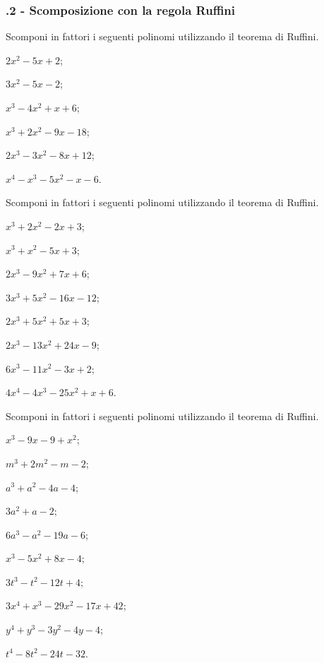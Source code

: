 \subsubsection*{\thechapter.2 - Scomposizione con la regola Ruffini}

\begin{esercizio}
\label{ese:17.11}
Scomponi in fattori i seguenti polinomi utilizzando il teorema di
Ruffini.
\begin{multicols}{3}
 \begin{enumeratea}
 \item $2x^{2}-5x+2$;
\item $3x^{2}-5x-2$;
\item $x^{3}-4x^{2}+x+6$;
\item $x^{3}+2x^{2}-9x-18$;
\item $2x^{3}-3x^{2}-8x+12$;
\item $x^{4}-x^{3}-5x^{2}-x-6$.
 \end{enumeratea}
\end{multicols}
\end{esercizio}

\begin{esercizio}
\label{ese:17.12}
Scomponi in fattori i seguenti polinomi utilizzando il teorema di
Ruffini.
\begin{multicols}{2}
 \begin{enumeratea}
 \item $x^{3}+2x^{2}-2x+3$;
\item $x^{3}+x^{2}-5x+3$;
\item $2x^{3}-9x^{2}+7x+6$;
\item $3x^{3}+5x^{2}-16x-12$;
\item $2x^{3}+5x^{2}+5x+3$;
\item $2x^{3}-13x^{2}+24x-9$;
\item $6x^{3}-11x^{2}-3x+2$;
\item $4x^{4}-4x^{3}-25x^{2}+x+6$.
 \end{enumeratea}
\end{multicols}
\end{esercizio}

\begin{esercizio}[\Ast]
\label{ese:17.13}
Scomponi in fattori i seguenti polinomi utilizzando il teorema di
Ruffini.
\begin{multicols}{2}
 \begin{enumeratea}
 \item $x^{3}-9x-9+x^{2}$;
\item $m^{3}+2m^{2}-m-2$;
\item $a^{3}+a^{2}-4a-4$;
\item $3a^{2}+a-2$;
\item $6a^{3}-a^{2}-19a-6$;
\item $x^{3}-5x^{2}+8x-4$;
\item $3t^{3}-t^{2}-12t+4$;
\item $3x^{4}+x^{3}-29x^{2}-17x+42$;
\item $y^{4}+y^{3}-3y^{2}-4y-4$;
\item $t^{4}-8t^{2}-24t-32$.
 \end{enumeratea}
\end{multicols}
\end{esercizio}

